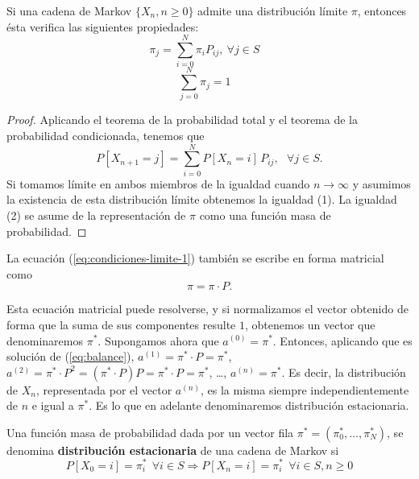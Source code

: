 \begin{proposicion}
    \label{prop:condiciones-limite}
    Si una cadena de Markov $\{X_n,n\geq 0\}$ admite una distribución límite $\pi$, entonces ésta verifica las siguientes propiedades:
    \begin{equation}
        \label{eq:condiciones-limite-1}
        \pi_j = \sum_{i=0}^N \pi_i P_{ij},\ \forall j\in S \ \ \ \ 
    \end{equation}
    \begin{equation}
        \label{eq:condiciones-limite-2}
        \sum_{j=0}^N \pi_j =1 \ \ \ \ 
    \end{equation}
    
\end{proposicion}
\begin{proof}
    Aplicando el teorema de la probabilidad total y el teorema de la probabilidad condicionada, tenemos que
    \begin{equation}
        \label{eq:prob-total-cond}
        P[X_{n+1}=j]=\sum_{i=0}^N P[X_n=i]\,P_{ij}, \ \ \ \forall j\in S.
    \end{equation}
    Si tomamos límite en ambos miembros de la igualdad cuando $n\rightarrow\infty$ y asumimos la existencia de esta distribución límite obtenemos la igualdad (1). La igualdad (2) se asume de la representación de $\pi$ como una función masa de probabilidad.
\end{proof}

La ecuación (\ref{eq:condiciones-limite-1}) también se escribe en forma matricial como 
\begin{equation}
    \label{eq:balance}
    \pi =\pi\cdot P.
\end{equation} 

Esta ecuación matricial puede resolverse, y si normalizamos el vector obtenido de forma que la suma de sus componentes resulte $1$, obtenemos un vector que denominaremos $\pi^*$. Supongamos ahora que $a^{(0)} = \pi^*$. Entonces, aplicando que es solución de (\ref{eq:balance}), $a^{(1)} = \pi^*\cdot P  = \pi^*$, $a^{(2)} = \pi^*\cdot P^2 = (\pi^* \cdot P) P = \pi^* \cdot P = \pi^*$, \dots, $a^{(n)}=\pi^*$. Es decir, la distribución de $X_n$, representada por el vector $a^{(n)}$, es la misma siempre independientemente de $n$ e igual a $\pi^*$. Es lo que en adelante denominaremos distribución estacionaria.

\begin{definicion}
    \label{def:estacionaria}
    Una función masa de probabilidad dada por un vector fila $\pi^* =(\pi_0^*,\dots,\pi_N^*)$, se denomina \textbf{distribución estacionaria} de una cadena de Markov si
    \begin{equation}
        P[X_0=i]=\pi_i^* \ \ \forall i\in S \Rightarrow P[X_n=i]=\pi_i^*\ \ \forall i\in S, n\geq 0
    \end{equation}
    
\end{definicion}

